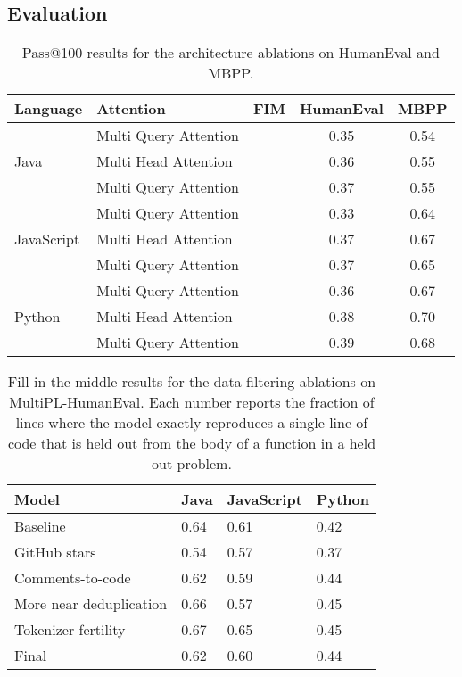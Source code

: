 \documentclass[10pt]{article} \usepackage{iclr2023_conference,times}
\newcommand{\cmark}{\ding{51}}\newcommand{\xmark}{\ding{55}}
\begin{document}
\subsection{Evaluation}
\label{sec:evaluation}

\begin{table}[t]
\centering
\begin{tabular}{llccc}
\toprule
Language & Attention & FIM  & HumanEval & MBPP\\
\midrule
\multirow{3}{*}{Java} & Multi Query Attention & \cmark & 0.35 & 0.54\\
& Multi Head Attention & \cmark & 0.36 & 0.55\\
& Multi Query Attention & \xmark &  0.37 & 0.55\\
\midrule
\multirow{3}{*}{JavaScript} & Multi Query Attention & \cmark & 0.33 & 0.64\\
& Multi Head Attention & \cmark & 0.37 &0.67 \\
& Multi Query Attention & \xmark & 0.37 & 0.65 \\
\midrule
\multirow{3}{*}{Python} & Multi Query Attention & \cmark & 0.36 & 0.67\\
& Multi Head Attention & \cmark & 0.38 & 0.70\\
& Multi Query Attention & \xmark & 0.39 & 0.68\\
\bottomrule
\end{tabular}
\caption{Pass@100 results for the architecture ablations on HumanEval and MBPP. }
\label{tab:architecture_ablations}
\end{table}

\begin{table}
\centering
\begin{tabular}{llll}
\toprule
Model                         & Java & JavaScript & Python \\
\midrule
Baseline                      & 0.64 & 0.61 & 0.42 \\
GitHub stars                  & 0.54 & 0.57 & 0.37 \\
Comments-to-code              & 0.62 & 0.59 & 0.44 \\
More near deduplication       & 0.66 & 0.57 & 0.45 \\
Tokenizer fertility          & 0.67 & 0.65 & 0.45 \\
\midrule
Final                         & 0.62 & 0.60 & 0.44 \\
\bottomrule
\end{tabular}
\caption{Fill-in-the-middle results for the data filtering ablations on MultiPL-HumanEval.  Each number reports the fraction of lines where the model exactly reproduces a single line of code that is held out from the body of a function in a held out problem. }
\label{table:fim_humaneval_ablations}
\end{table}
\end{document}
